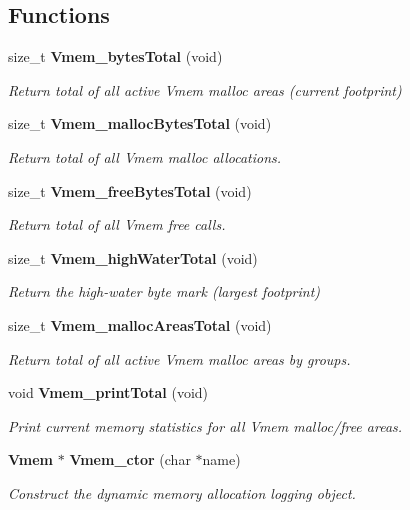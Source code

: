 \subsection*{Functions}
\begin{DoxyCompactItemize}
\item 
size\-\_\-t {\bf Vmem\-\_\-bytes\-Total} (void)
\begin{DoxyCompactList}\small\item\em Return total of all active Vmem malloc areas (current footprint) \end{DoxyCompactList}\item 
size\-\_\-t {\bf Vmem\-\_\-malloc\-Bytes\-Total} (void)
\begin{DoxyCompactList}\small\item\em Return total of all Vmem malloc allocations. \end{DoxyCompactList}\item 
size\-\_\-t {\bf Vmem\-\_\-free\-Bytes\-Total} (void)
\begin{DoxyCompactList}\small\item\em Return total of all Vmem free calls. \end{DoxyCompactList}\item 
size\-\_\-t {\bf Vmem\-\_\-high\-Water\-Total} (void)
\begin{DoxyCompactList}\small\item\em Return the high-\/water byte mark (largest footprint) \end{DoxyCompactList}\item 
size\-\_\-t {\bf Vmem\-\_\-malloc\-Areas\-Total} (void)
\begin{DoxyCompactList}\small\item\em Return total of all active Vmem malloc areas by groups. \end{DoxyCompactList}\item 
void {\bf Vmem\-\_\-print\-Total} (void)
\begin{DoxyCompactList}\small\item\em Print current memory statistics for all Vmem malloc/free areas. \end{DoxyCompactList}\item 
{\bf Vmem} $\ast$ {\bf Vmem\-\_\-ctor} (char $\ast$name)
\begin{DoxyCompactList}\small\item\em Construct the dynamic memory allocation logging object. \end{DoxyCompactList}\item 

\end{DoxyCompactItemize}

